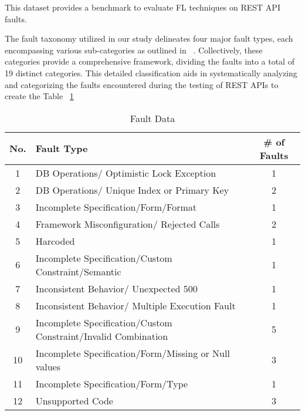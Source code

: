 \documentclass[conference]{IEEEtran}
\begin{document}
This dataset provides a benchmark to evaluate FL techniques on REST API faults.



The fault taxonomy utilized in our study delineates four major fault types, each encompassing various sub-categories as outlined in ~\cite{automatedTestTaxonomy}. Collectively, these categories provide a comprehensive framework, dividing the faults into a total of 19 distinct categories. 
This detailed classification aids in systematically analyzing and categorizing the faults encountered during the testing of REST APIs to create the Table ~\ref{tab:faultData}


\begin{table}[ht]
    \centering
    \caption{Fault Data}
    \label{tab:faultData}
    \begin{tabular}{|c|p{6cm}|c|}
    \hline
        \hline
        \textbf{No.} & \textbf{Fault Type} & \textbf{\# of Faults} \\ \hline
        1 & DB Operations/ Optimistic Lock Exception & 1 \\ \hline
        2 & DB Operations/ Unique Index or Primary Key &  2 \\ \hline
        3 & Incomplete Specification/Form/Format & 1 \\ \hline
        4 & Framework Misconfiguration/ Rejected Calls & 2 \\ \hline
        5 & Harcoded & 1 \\ \hline
        6 & Incomplete Specification/Custom Constraint/Semantic & 1 \\ \hline
        7 & Inconsistent Behavior/ Unexpected 500 & 1 \\ \hline
        8 & Inconsistent Behavior/ Multiple Execution Fault & 1 \\ \hline 
        9 & Incomplete Specification/Custom Constraint/Invalid Combination & 5 \\ \hline 
        10 & Incomplete Specification/Form/Missing or Null values & 3 \\ \hline
        11 & Incomplete Specification/Form/Type & 1 \\ \hline
        12 & Unsupported Code & 3 \\ \hline
    \end{tabular}
\end{table}
    
\end{document}
